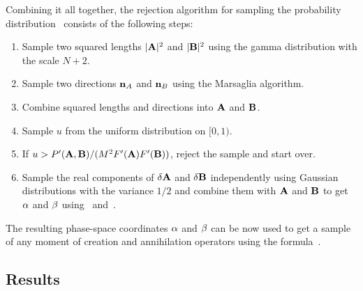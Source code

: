 Combining it all together, the rejection algorithm for sampling the probability distribution~ consists of the following steps:
\begin{enumerate}
\item Sample two squared lengths $|\mathbf{A}|^2$ and $|\mathbf{B}|^2$ using the gamma distribution with the scale $N+2$.
\item Sample two directions $\mathbf{n}_A$ and $\mathbf{n}_B$ using the Marsaglia algorithm.
\item Combine squared lengths and directions into $\mathbf{A}$ and $\mathbf{B}$.
\item Sample $u$ from the uniform distribution on $[0,1)$.
\item If $u > P^\prime(\mathbf{A},\mathbf{B}) / (M^2 F^\prime(\mathbf{A}) F^\prime(\mathbf{B}))$, reject the sample and start over.
\item Sample the real components of $\delta\mathbf{A}$ and $\delta\mathbf{B}$ independently using Gaussian distributions with the variance $1/2$ and combine them with $\mathbf{A}$ and $\mathbf{B}$ to get $\mathbf{\alpha}$ and $\mathbf{\beta}$ using~ and~.
\end{enumerate}
The resulting phase-space coordinates $\mathbf{\alpha}$ and $\mathbf{\beta}$ can be now used to get a sample of any moment of creation and annihilation operators using the formula~.


\subsection{Results}

